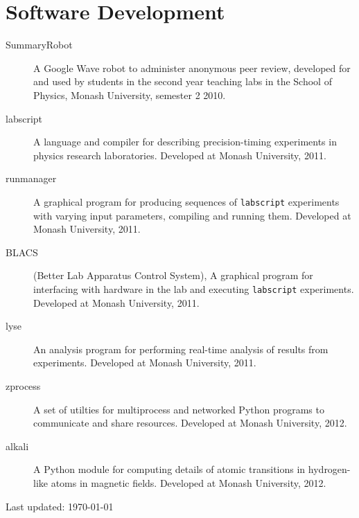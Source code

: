 \documentclass[10pt,letterpaper]{article}
\begin{document}
\section*{Software Development}
\begin{description}
\item[SummaryRobot] A Google Wave robot to administer anonymous peer review, developed for and used by students in the second year teaching labs in the School of Physics, Monash University, semester 2 2010.

\item[labscript] A language and compiler for describing precision-timing experiments in physics research laboratories. Developed at Monash University, 2011.

\item[runmanager] A graphical program for producing sequences of \texttt{labscript} experiments with varying input parameters, compiling and running them. Developed at Monash University, 2011.

\item[BLACS] (Better Lab Apparatus Control System), A graphical program for interfacing with hardware in the lab and executing \texttt{labscript} experiments. Developed at Monash University, 2011.

\item[lyse] An analysis program for performing real-time analysis of results from experiments.  Developed at Monash University, 2011.

\item[zprocess] A set of utilties for multiprocess and networked Python programs to communicate and share resources. Developed at Monash University, 2012.

\item[alkali] A Python module for computing details of atomic transitions in hydrogen-like atoms in magnetic fields. Developed at Monash University, 2012.
\end{description}

\medskip

\begin{center}
  \begin{small}
    Last updated: \today
  \end{small}
\end{center}
\end{document}
